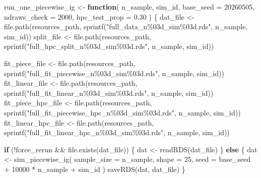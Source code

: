 \documentclass[
  english,
  letterpaper,
  DIV=11,
  numbers=noendperiod]{scrartcl}
\newenvironment{Shaded}{\begin{snugshade}}{\end{snugshade}}
\newcommand{\AttributeTok}[1]{\textcolor[rgb]{0.40,0.45,0.13}{#1}}
\newcommand{\ControlFlowTok}[1]{\textcolor[rgb]{0.00,0.23,0.31}{\textbf{#1}}}
\newcommand{\DecValTok}[1]{\textcolor[rgb]{0.68,0.00,0.00}{#1}}
\newcommand{\FloatTok}[1]{\textcolor[rgb]{0.68,0.00,0.00}{#1}}
\newcommand{\FunctionTok}[1]{\textcolor[rgb]{0.28,0.35,0.67}{#1}}
\newcommand{\NormalTok}[1]{\textcolor[rgb]{0.00,0.23,0.31}{#1}}
\newcommand{\OtherTok}[1]{\textcolor[rgb]{0.00,0.23,0.31}{#1}}
\newcommand{\SpecialCharTok}[1]{\textcolor[rgb]{0.37,0.37,0.37}{#1}}
\newcommand{\StringTok}[1]{\textcolor[rgb]{0.13,0.47,0.30}{#1}}
\begin{document}
\begin{Shaded}
\begin{Highlighting}[]
\NormalTok{run\_one\_piecewise\_ig }\OtherTok{\textless{}{-}} \ControlFlowTok{function}\NormalTok{(}
\NormalTok{  n\_sample,}
\NormalTok{  sim\_id,}
  \AttributeTok{base\_seed =} \DecValTok{20260505}\NormalTok{,}
  \AttributeTok{ndraws\_check =} \DecValTok{2000}\NormalTok{,}
  \AttributeTok{hpc\_test\_prop =} \FloatTok{0.30}
\NormalTok{) \{}
\NormalTok{  dat\_file }\OtherTok{\textless{}{-}} \FunctionTok{file.path}\NormalTok{(resources\_path, }\FunctionTok{sprintf}\NormalTok{(}\StringTok{"full\_data\_n\%03d\_sim\%03d.rds"}\NormalTok{, n\_sample, sim\_id))}
\NormalTok{  split\_file }\OtherTok{\textless{}{-}} \FunctionTok{file.path}\NormalTok{(resources\_path, }\FunctionTok{sprintf}\NormalTok{(}\StringTok{"full\_hpc\_split\_n\%03d\_sim\%03d.rds"}\NormalTok{, n\_sample, sim\_id))}

\NormalTok{  fit\_piece\_file }\OtherTok{\textless{}{-}} \FunctionTok{file.path}\NormalTok{(resources\_path, }\FunctionTok{sprintf}\NormalTok{(}\StringTok{"full\_fit\_piecewise\_n\%03d\_sim\%03d.rds"}\NormalTok{, n\_sample, sim\_id))}
\NormalTok{  fit\_linear\_file }\OtherTok{\textless{}{-}} \FunctionTok{file.path}\NormalTok{(resources\_path, }\FunctionTok{sprintf}\NormalTok{(}\StringTok{"full\_fit\_linear\_n\%03d\_sim\%03d.rds"}\NormalTok{, n\_sample, sim\_id))}
\NormalTok{  fit\_piece\_hpc\_file }\OtherTok{\textless{}{-}} \FunctionTok{file.path}\NormalTok{(resources\_path, }\FunctionTok{sprintf}\NormalTok{(}\StringTok{"full\_fit\_piecewise\_hpc\_n\%03d\_sim\%03d.rds"}\NormalTok{, n\_sample, sim\_id))}
\NormalTok{  fit\_linear\_hpc\_file }\OtherTok{\textless{}{-}} \FunctionTok{file.path}\NormalTok{(resources\_path, }\FunctionTok{sprintf}\NormalTok{(}\StringTok{"full\_fit\_linear\_hpc\_n\%03d\_sim\%03d.rds"}\NormalTok{, n\_sample, sim\_id))}

  \ControlFlowTok{if}\NormalTok{ (}\SpecialCharTok{!}\NormalTok{force\_rerun }\SpecialCharTok{\&\&} \FunctionTok{file.exists}\NormalTok{(dat\_file)) \{}
\NormalTok{    dat }\OtherTok{\textless{}{-}} \FunctionTok{readRDS}\NormalTok{(dat\_file)}
\NormalTok{  \} }\ControlFlowTok{else}\NormalTok{ \{}
\NormalTok{    dat }\OtherTok{\textless{}{-}} \FunctionTok{sim\_piecewise\_ig}\NormalTok{(}
      \AttributeTok{sample\_size =}\NormalTok{ n\_sample,}
      \AttributeTok{shape =} \DecValTok{25}\NormalTok{,}
      \AttributeTok{seed =}\NormalTok{ base\_seed }\SpecialCharTok{+} \DecValTok{10000} \SpecialCharTok{*}\NormalTok{ n\_sample }\SpecialCharTok{+}\NormalTok{ sim\_id}
\NormalTok{    )}
    \FunctionTok{saveRDS}\NormalTok{(dat, dat\_file)}
\NormalTok{  \}}


\end{Highlighting}
\end{Shaded}
\end{document}
